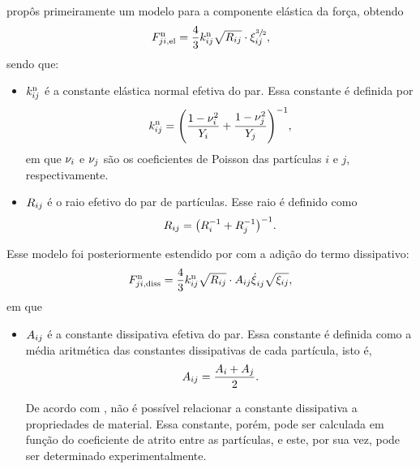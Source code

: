  propôs primeiramente um modelo para a componente elástica da força, obtendo
\begin{equation*}
	F_{ji,\text{el}}^{\text{n}} = \dfrac{4}{3}{k}_{i j}^{\text{n}}\sqrt{{R}_{i j}}\cdot{\xi}_{i j}^{\sfrac{3}{2}},
\end{equation*}
sendo que:
\begin{itemize}
	\item \({k}_{i j}^{\text{n}}\) é a constante elástica normal efetiva do par. Essa constante é definida por
		\begin{equation*}
			\effectiveNormalElasticij = \pqty{\dfrac{1-\poissoni^2}{\elasticModulusi} + \dfrac{1-\poissonj^2}{\elasticModulusj}}^{-1},
		\end{equation*}
		em que \({\nu}_{i}\) e \({\nu}_{j}\) são os coeficientes de Poisson das partículas \(i\) e \(j\), respectivamente.

	\item \({R}_{i j}\) é o raio efetivo do par de partículas. Esse raio é definido como
		\begin{equation*}
			\effectiveRadiusij = \pqty{\radiusi^{-1} + \radiusj^{-1}}^{-1}.
		\end{equation*}
\end{itemize}

Esse modelo foi posteriormente estendido por  com a adição do termo dissipativo:
\begin{equation*}
	\normalDissipativeForceji = \dfrac{4}{3}\effectiveNormalElasticij\sqrt{\effectiveRadiusij}\cdot \normalDissipativeConstantij\overlapDerivativeij\sqrt{\overlapij},
\end{equation*}
em que
\begin{itemize}
	\item \({A}_{i j}\) é a constante dissipativa efetiva do par. Essa constante é definida como a média aritmética das constantes dissipativas de cada partícula, isto é,
	\begin{equation*}
		{A}_{i j} = \dfrac{{A}_{i} + {A}_{j}}{2}.
	\end{equation*}

	De acordo com , não é possível relacionar a constante dissipativa a propriedades de material. Essa constante, porém, pode ser calculada em função do coeficiente de atrito entre as partículas, e este, por sua vez, pode ser determinado experimentalmente.
\end{itemize}

